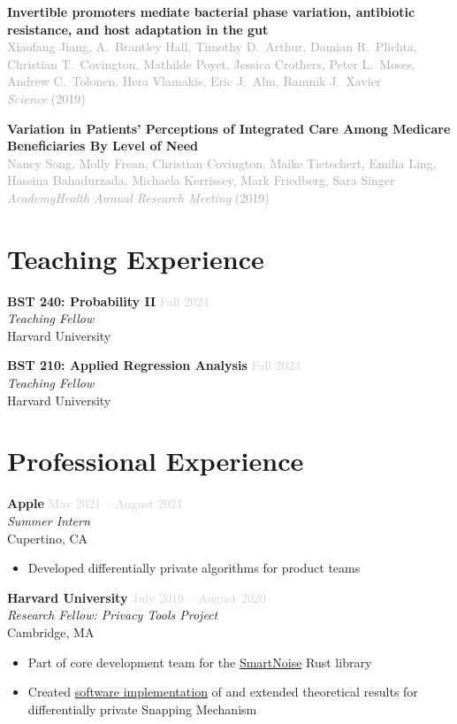 \documentclass[11pt,a4paper]{article}
\newcommand{\cvitem}[4]{
    \noindent\textbf{#1} \hfill \textcolor{lightgray}{#2} \\
    \textit{#3} \\
    #4 \vspace{6pt}
}
\newcommand{\cvpub}[2]{
    \vspace{4pt}
    \noindent\textbf{#1} \\
    \textcolor{darkgray}{#2} \vspace{2pt}
}
\begin{document}
\cvpub{Invertible promoters mediate bacterial phase variation, antibiotic resistance, and host adaptation in the gut}
      {Xiaofang Jiang, A.\ Brantley Hall, Timothy D.\ Arthur, Damian R.\ Plichta, Christian T.\ Covington, Mathilde Poyet, Jessica Crothers, Peter L.\ Moses, Andrew C.\ Tolonen, Hera Vlamakis, Eric J.\ Alm, Ramnik J.\ Xavier \\ 
      \textit{Science} (2019)}

\cvpub{Variation in Patients' Perceptions of Integrated Care Among Medicare Beneficiaries By Level of Need}
      {Nancy Song, Molly Frean, Christian Covington, Maike Tietschert, Emilia Ling, Hassina Bahadurzada, Michaela Kerrissey, Mark Friedberg, Sara Singer \\ 
      \textit{AcademyHealth Annual Research Meeting} (2019)}

\section{Teaching Experience}

\cvitem{BST 240: Probability II}{Fall 2024}{Teaching Fellow}{Harvard University}

\cvitem{BST 210: Applied Regression Analysis}{Fall 2023}{Teaching Fellow}{Harvard University}

\section{Professional Experience}

\cvitem{Apple}{May 2021 -- August 2021}{Summer Intern}{
    Cupertino, CA
    \begin{itemize}
        \item Developed differentially private algorithms for product teams
    \end{itemize}
}

\cvitem{Harvard University}{July 2019 -- August 2020}{Research Fellow: Privacy Tools Project}{
    Cambridge, MA
    \begin{itemize}
        \item Part of core development team for the \href{https://github.com/opendifferentialprivacy/smartnoise-core}{SmartNoise} Rust library
        \item Created \href{https://github.com/ctcovington/floating_point}{software implementation} of and extended theoretical results for differentially private Snapping Mechanism
    \end{itemize}
}
\end{document}
